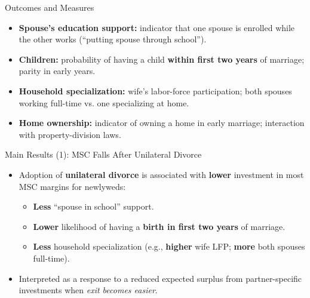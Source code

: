 \documentclass[11pt,notes=hide,aspectratio=169,mathserif]{beamer}
\begin{document}
\begin{frame}{Outcomes and Measures}
\small
\begin{itemize}
  \item \textbf{Spouse’s education support:} indicator that one spouse is enrolled while the other works (``putting spouse through school'').
  \item \textbf{Children:} probability of having a child \textbf{within first two years} of marriage; parity in early years.
  \item \textbf{Household specialization:} wife’s labor-force participation; both spouses working full-time vs. one specializing at home.
  \item \textbf{Home ownership:} indicator of owning a home in early marriage; interaction with property-division laws.
\end{itemize}
\end{frame}

\begin{frame}{Main Results (1): MSC Falls After Unilateral Divorce}
\small
\begin{itemize}
  \item Adoption of \textbf{unilateral divorce} is associated with \textbf{lower} investment in most MSC margins for newlyweds:
  \begin{itemize}
    \item \textbf{Less} ``spouse in school'' support.
    \item \textbf{Lower} likelihood of having a \textbf{birth in first two years} of marriage.
    \item \textbf{Less} household specialization (e.g., \textbf{higher} wife LFP; \textbf{more} both spouses full-time).
  \end{itemize}
  \item Interpreted as a response to a reduced expected surplus from partner-specific investments when \emph{exit becomes easier}.
\end{itemize}
\end{frame}
\end{document}
